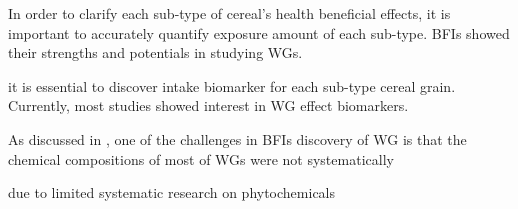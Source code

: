 In order to clarify each sub-type of cereal's health beneficial effects, it is important to accurately quantify exposure amount of each sub-type. BFIs showed their strengths and potentials in studying WGs. 


it is essential to discover intake biomarker for each sub-type cereal grain.
Currently, most studies showed interest in WG effect biomarkers.

As discussed in \cite{ISI:000447355100002}, one of the challenges in BFIs discovery of WG is that the chemical compositions of most of WGs were not systematically 

due to limited systematic research on phytochemicals 

